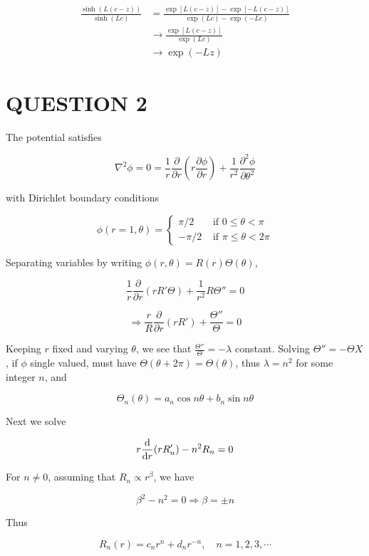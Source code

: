 \documentclass[a4paper]{article}
\begin{document}
\begin{align*}
\frac{\sinh(L(c-z))}{\sinh(Lc)} & = \frac{\exp[ L(c-z)]  - \exp[-L(c-z)]  }{\exp(Lc) - \exp(-Lc)  }\\
& \to \frac{\exp[ L(c-z)]}{\exp(Lc)} \\
& \to \exp(-Lz)
\end{align*}





\section{QUESTION 2}


The potential satisfies

\[ \nabla^{2} \phi = 0 = \frac{1}{r} \frac{\partial }{\partial r} \left(  r \frac{\partial \phi}{\partial r}  \right) + \frac{1}{r^{2}} \frac{\partial^{2} \phi}{\partial \theta^{2}}   \]

with Dirichlet boundary conditions

\[ \phi(r=1,\theta) = \begin{cases} \pi / 2  & \text{ if } 0 \leq \theta < \pi \\ - \pi / 2 & \text{ if } \pi \leq \theta < 2\pi \end{cases} \]

Separating variables by writing $ \phi(r,\theta) = R(r) \Theta(\theta) $,

\[ \frac{1}{r}  \frac{\partial }{\partial r} (  r R' \Theta )  + \frac{1}{r^{2}} R \Theta '' = 0   \]

\[ \Rightarrow \frac{r}{R}  \frac{\partial }{\partial r}  ( r R') + \frac{\Theta''}{\Theta}  = 0   \]

Keeping $ r $ fixed and varying $ \theta $, we see that $ \frac{\Theta''}{\Theta} = - \lambda $ constant.
Solving $ \Theta'' = - \Theta X $, if $ \phi $ single valued, must have $ \Theta(\theta + 2\pi) = \Theta(\theta)  $, thus $ \lambda = n^{2} $ for some integer $ n $, and 

\[ \Theta_{n}(\theta) = a_{n} \cos n \theta + b_{n} \sin n \theta  \]

Next we solve

\[ r \frac{\mathrm{d} }{\mathrm{d} r}(r R'_{n}) - n^{2} R_{n}= 0\]

For $ n \neq 0 $, assuming that $ R_{n} \propto r^{\beta} $, we have

\[ \beta^{2} - n^{2} = 0 \Rightarrow \beta = \pm n \]

Thus 

\[ R_{n}(r) = c_{n}r^{n} + d_{n} r^{-n}, \quad n = 1,2,3,\cdots \]
\end{document}
